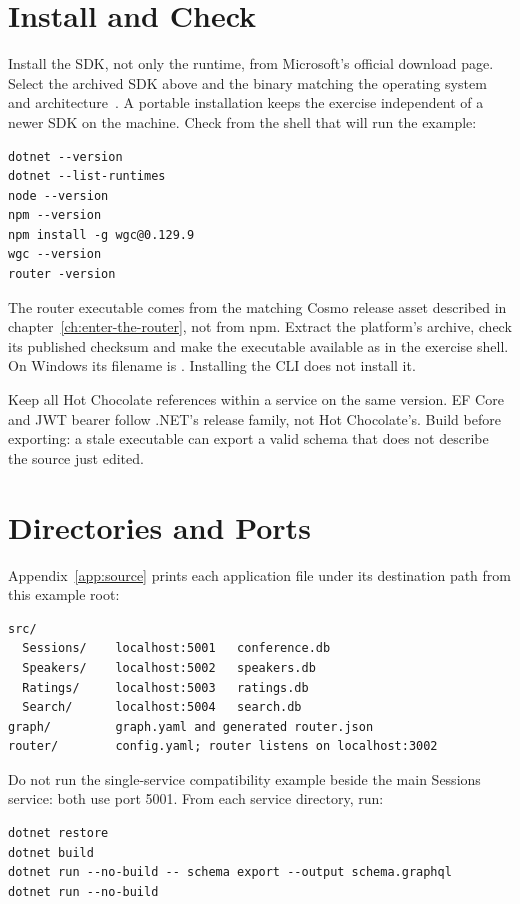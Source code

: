 \section{Install and Check}

Install the SDK, not only the runtime, from Microsoft's official download
page. Select the archived SDK above and the binary matching the operating
system and architecture~\autocite{dotnetdownloadrepair}. A portable
installation keeps the exercise independent of a newer SDK on the machine.
Check from the shell that will run the example:

\begin{verbatim}
dotnet --version
dotnet --list-runtimes
node --version
npm --version
npm install -g wgc@0.129.9
wgc --version
router -version
\end{verbatim}

The router executable comes from the matching Cosmo release asset described
in chapter~\ref{ch:enter-the-router}, not from npm. Extract the platform's
archive, check its published checksum and make the executable available as
 in the exercise shell. On Windows its filename is
. Installing the CLI does not install it.

Keep all Hot Chocolate references within a service on the same version.
EF Core and JWT bearer follow .NET's release family, not Hot Chocolate's.
Build before exporting: a stale executable can export a valid schema that
does not describe the source just edited.

\section{Directories and Ports}

Appendix~\ref{app:source} prints each application file under its destination
path from this example root:

\begin{verbatim}
src/
  Sessions/    localhost:5001   conference.db
  Speakers/    localhost:5002   speakers.db
  Ratings/     localhost:5003   ratings.db
  Search/      localhost:5004   search.db
graph/         graph.yaml and generated router.json
router/        config.yaml; router listens on localhost:3002
\end{verbatim}

Do not run the single-service compatibility example beside the main Sessions
service: both use port 5001. From each service directory, run:

\begin{verbatim}
dotnet restore
dotnet build
dotnet run --no-build -- schema export --output schema.graphql
dotnet run --no-build
\end{verbatim}

